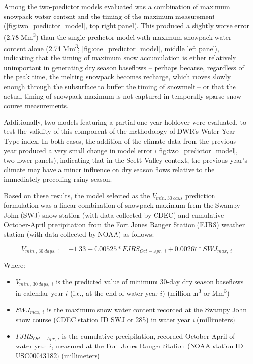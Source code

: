 \documentclass[hess, manuscript]{copernicus}
\providecommand{\tightlist}{%
  \setlength{\itemsep}{0pt}\setlength{\parskip}{0pt}}
\begin{document}
Among the two-predictor models evaluated was a combination of maximum
snowpack water content and the timing of the maximum measurement
(\autoref{fig:two_predictor_model}, top right panel). This produced a
slightly worse error (2.78 Mm\textsuperscript{3}) than the
single-predictor model with maximum snowpack water content alone (2.74
Mm\textsuperscript{3}; \autoref{fig:one_predictor_model}, middle left
panel), indicating that the timing of maximum snow accumulation is
either relatively unimportant in generating dry season baseflows --
perhaps because, regardless of the peak time, the melting snowpack
becomes recharge, which moves slowly enough through the subsurface to
buffer the timing of snowmelt -- or that the actual timing of snowpack
maximum is not captured in temporally sparse snow course measurements.

Additionally, two models featuring a partial one-year holdover were
evaluated, to test the validity of this component of the methodology of
DWR's Water Year Type index. In both cases, the addition of the climate
data from the previous year produced a very small change in model error
(\autoref{fig:two_predictor_model}, two lower panels), indicating that
in the Scott Valley context, the previous year's climate may have a
minor influence on dry season flows relative to the immediately
preceding rainy season.

Based on these results, the model selected as the \(V_{min.~30~days}\)
prediction formulation was a linear combination of snowpack maximum from
the Swampy John (SWJ) snow station (with data collected by CDEC) and
cumulative October-April precipitation from the Fort Jones Ranger
Station (FJRS) weather station (with data collected by NOAA) as follows:

\[V_{min.,~30~days,~i} = -1.33 + 0.00525 * FJRS_{Oct-Apr,~i}+0.00267*SWJ_{max,~i}\]

Where:

\begin{itemize}
\tightlist
\item
  \(V_{min.,~30~days,~i}\) is the predicted value of minimum 30-day dry
  season baseflows in calendar year \(i\) (i.e., at the end of water
  year \(i\)) (million m\textsuperscript{3} or Mm\textsuperscript{3})
\item
  \(SWJ_{max,~i}\) is the maximum snow water content recorded at the
  Swampy John snow course (CDEC station ID SWJ or 285) in water year
  \(i\) (millimeters)
\item
  \(FJRS_{Oct-Apr,~i}\) is the cumulative precipitation, recorded
  October-April of water year \(i\), measured at the Fort Jones Ranger
  Station (NOAA station ID USC00043182) (millimeters)
\end{itemize}
\end{document}
